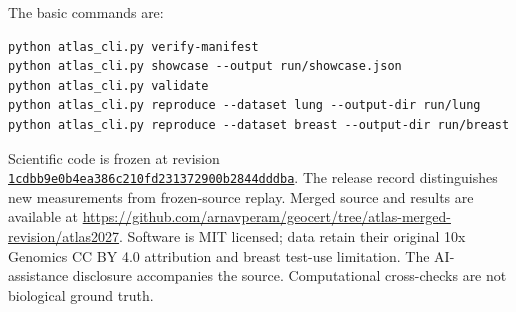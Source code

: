 \documentclass[10pt,letterpaper]{article}
\begin{document}
The basic commands are:
\begin{verbatim}
python atlas_cli.py verify-manifest
python atlas_cli.py showcase --output run/showcase.json
python atlas_cli.py validate
python atlas_cli.py reproduce --dataset lung --output-dir run/lung
python atlas_cli.py reproduce --dataset breast --output-dir run/breast
\end{verbatim}
Scientific code is frozen at revision \href{https://github.com/arnavperam/geocert/tree/1cdbb9e0b4ea386c210fd231372900b2844dddba/atlas2027}{\nolinkurl{1cdbb9e0b4ea386c210fd231372900b2844dddba}}. The release record distinguishes new measurements from frozen-source replay. Merged source and results are available at \url{https://github.com/arnavperam/geocert/tree/atlas-merged-revision/atlas2027}. Software is MIT licensed; data retain their original 10x Genomics CC BY 4.0 attribution and breast test-use limitation. The AI-assistance disclosure accompanies the source. Computational cross-checks are not biological ground truth.
\end{document}
